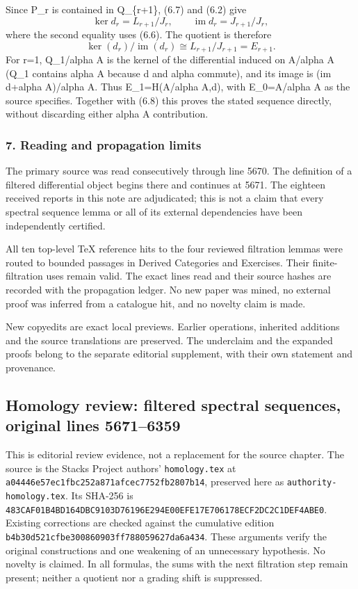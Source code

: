 \documentclass[11pt]{article}
\begin{document}
Since P\_r is contained in Q\_\{r+1\}, (6.7) and (6.2) give \[
\ker d_r=L_{r+1}/J_r,\qquad
\operatorname{im}d_r=J_{r+1}/J_r,
\] where the second equality uses (6.6). The quotient is therefore \[
\ker(d_r)/\operatorname{im}(d_r)
\cong L_{r+1}/J_{r+1}=E_{r+1}.                            \tag{6.8}
\] For r=1, Q\_1/alpha A is the kernel of the differential induced on A/alpha A (Q\_1 contains alpha A because d and alpha commute), and its image is (im d+alpha A)/alpha A. Thus E\_1=H(A/alpha A,d), with E\_0=A/alpha A as the source specifies. Together with (6.8) this proves the stated sequence directly, without discarding either alpha A contribution.

\subsubsection{7. Reading and propagation limits}\label{reading-and-propagation-limits}

The primary source was read consecutively through line 5670. The definition of a filtered differential object begins there and continues at 5671. The eighteen received reports in this note are adjudicated; this is not a claim that every spectral sequence lemma or all of its external dependencies have been independently certified.

All ten top-level TeX reference hits to the four reviewed filtration lemmas were routed to bounded passages in Derived Categories and Exercises. Their finite-filtration uses remain valid. The exact lines read and their source hashes are recorded with the propagation ledger. No new paper was mined, no external proof was inferred from a catalogue hit, and no novelty claim is made.

New copyedits are exact local previews. Earlier operations, inherited additions and the source translations are preserved. The underclaim and the expanded proofs belong to the separate editorial supplement, with their own statement and provenance.
\clearpage
\subsection{Homology review: filtered spectral sequences, original lines 5671--6359}\label{homology-review-filtered-spectral-sequences-original-lines-56716359}

This is editorial review evidence, not a replacement for the source chapter. The source is the Stacks Project authors' \texttt{homology.tex} at \texttt{a04446e57ec1fbc252a871afcec7752fb2807b14}, preserved here as \texttt{authority-homology.tex}. Its SHA-256 is \texttt{483CAF01B4BD164DBC9103D76196E294E00EFE17E706178ECF2DC2C1DEF4ABE0}. Existing corrections are checked against the cumulative edition \texttt{b4b30d521cfbe300860903ff788059627da6a434}. These arguments verify the original constructions and one weakening of an unnecessary hypothesis. No novelty is claimed. In all formulas, the sums with the next filtration step remain present; neither a quotient nor a grading shift is suppressed.
\end{document}
